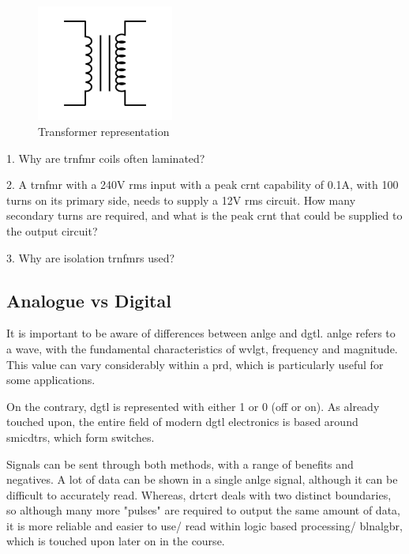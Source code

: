 \documentclass[a4paper,11pt]{report}
\newcommand{\Quiz}[1] %
{
\par\noindent %
\phantomsection %
\todo[inline, color=blue!30]{\textbf{#1}} %
\vspace{1em} %
}
\begin{document}
\begin{figure}[H]
\centering
\includegraphics[width=0.4\textwidth]{Transformer1}
\caption{Transformer representation}
\end{figure}

\Quiz{Quiz}

1. Why are \gls{trnfmr} coils often laminated?

2. A \gls{trnfmr} with a 240V \gls{rms} input with a peak \gls{crnt} capability of 0.1A, with 100 turns on its primary side, needs to supply a 12V \gls{rms} circuit. How many secondary turns are required, and what is the peak \gls{crnt} that could be supplied to the output circuit?

3. Why are isolation \gls{trnfmr}s used?

\vspace*{1\baselineskip}

\subsection{Analogue vs Digital}

It is important to be aware of differences between \gls{anlge} and \gls{dgtl}. \gls{anlge} refers to a wave, with the fundamental characteristics of \gls{wvlgt}, frequency and magnitude. This value can vary considerably within a \gls{prd}, which is particularly useful for some applications.

On the contrary, \gls{dgtl} is represented with either 1 or 0 (off or on). As already touched upon, the entire field of modern \gls{dgtl} electronics is based around \gls{smicdtr}s, which form switches.

Signals can be sent through both methods, with a range of benefits and negatives. A lot of data can be shown in a single \gls{anlge} signal, although it can be difficult to accurately read. Whereas, \gls{drtcrt} deals with two distinct boundaries, so although many more "pulses" are required to output the same amount of data, it is more reliable and easier to use/ read within logic based processing/ \gls{blnalgbr}, which is touched upon later on in the course.
\end{document}
